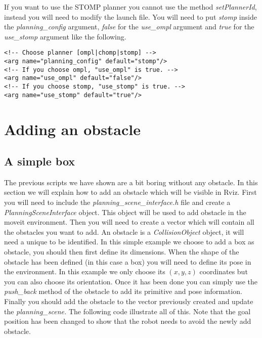 If you want to use the STOMP planner you cannot use the method \emph{setPlannerId}, instead you will need to modify the launch file. You will need to put \emph{stomp} inside the \emph{planning\_config} argument, \emph{false} for the \emph{use\_ompl} argument and \emph{true} for the \emph{use\_stomp} argument like the following. 



\begin{lstlisting}
<!-- Choose planner [ompl|chomp|stomp] -->
<arg name="planning_config" default="stomp"/>
<!-- If you choose ompl, "use_ompl" is true. -->
<arg name="use_ompl" default="false"/>
<!-- If you choose stomp, "use_stomp" is true. -->
<arg name="use_stomp" default="true"/>
\end{lstlisting}


\section{Adding an obstacle}
\subsection{A simple box}

The previous scripts we have shown are a bit boring without any obstacle. In this section we will explain how to add an obstacle which will be visible in Rviz. First you will need to include the \emph{planning\_scene\_interface.h} file and create a \emph{PlanningSceneInterface} object. This object will be used to add obstacle in the moveit environment. Then you will need to create a vector which will contain all the obstacles you want to add. An obstacle is a \emph{CollisionObject} object, it will need a unique to be identified. In this simple example we choose to add a box as obstacle, you should then first define its dimensions. When the shape of the obstacle has been defined (in this case a box) you will need to define its pose in the environment. In this example we only choose its $(x,y,z)$ coordinates but you can also choose its orientation. Once it has been done you can simply use the \emph{push\_back} method of the obstacle to add its primitive and pose information. Finally you should add the obstacle to the vector previously created and update the \emph{planning\_scene.
}
The following code illustrate all of this. Note that the goal position has been changed to show that the robot needs to avoid the newly add obstacle.





